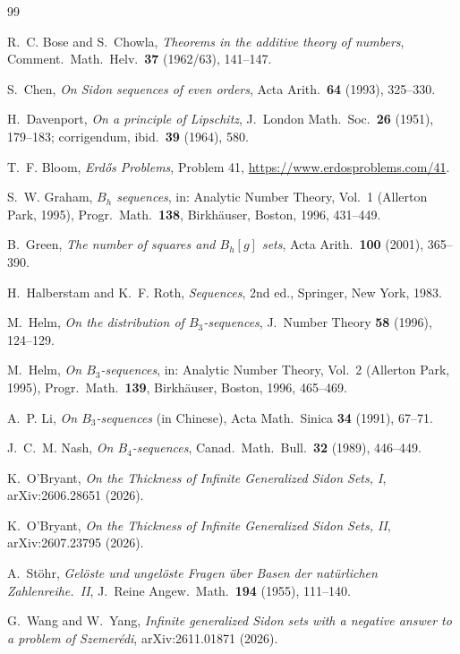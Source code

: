 \documentclass[11pt]{amsart}
\theoremstyle{remark}
\begin{document}
\begin{thebibliography}{99}

R.~C. Bose and S.~Chowla, \emph{Theorems in the additive theory of numbers}, Comment.\ Math.\ Helv.\ \textbf{37} (1962/63), 141--147.

S.~Chen, \emph{On Sidon sequences of even orders}, Acta Arith.\ \textbf{64} (1993), 325--330.

H.~Davenport, \emph{On a principle of Lipschitz}, J.~London Math.\ Soc.\ \textbf{26} (1951), 179--183; corrigendum, ibid.\ \textbf{39} (1964), 580.

T.~F. Bloom, \emph{Erd\H{o}s Problems}, Problem 41, \url{https://www.erdosproblems.com/41}.

S.~W. Graham, \emph{$B_h$ sequences}, in: Analytic Number Theory, Vol.~1 (Allerton Park, 1995), Progr.\ Math.\ \textbf{138}, Birkh\"auser, Boston, 1996, 431--449.

B.~Green, \emph{The number of squares and $B_h[g]$ sets}, Acta Arith.\ \textbf{100} (2001), 365--390.

H.~Halberstam and K.~F. Roth, \emph{Sequences}, 2nd ed., Springer, New York, 1983.

M.~Helm, \emph{On the distribution of $B_3$-sequences}, J.~Number Theory \textbf{58} (1996), 124--129.

M.~Helm, \emph{On $B_3$-sequences}, in: Analytic Number Theory, Vol.~2 (Allerton Park, 1995), Progr.\ Math.\ \textbf{139}, Birkh\"auser, Boston, 1996, 465--469.

A.~P. Li, \emph{On $B_3$-sequences} (in Chinese), Acta Math.\ Sinica \textbf{34} (1991), 67--71.

J.~C.~M. Nash, \emph{On $B_4$-sequences}, Canad.\ Math.\ Bull.\ \textbf{32} (1989), 446--449.

K.~O'Bryant, \emph{On the Thickness of Infinite Generalized Sidon Sets, I}, arXiv:2606.28651 (2026).

K.~O'Bryant, \emph{On the Thickness of Infinite Generalized Sidon Sets, II}, arXiv:2607.23795 (2026).


A.~St\"ohr, \emph{Gel\"oste und ungel\"oste Fragen \"uber Basen der nat\"urlichen Zahlenreihe.\ II}, J.~Reine Angew.\ Math.\ \textbf{194} (1955), 111--140.

G.~Wang and W.~Yang, \emph{Infinite generalized Sidon sets with a negative answer to a problem of Szemer\'edi}, arXiv:2611.01871 (2026).

\end{thebibliography}
\end{document}
